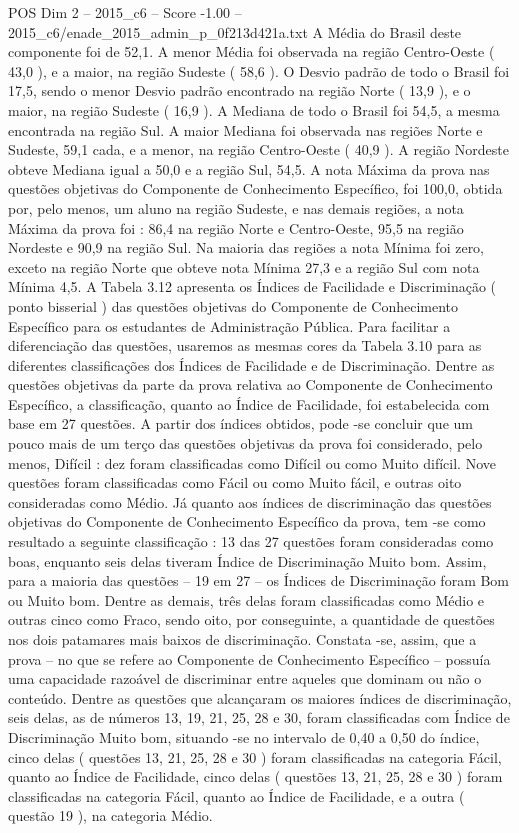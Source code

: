 \begin{textsample}{POS Dim 2 – 2015\_c6 – Score -1.00 – 2015\_c6/enade\_2015\_admin\_p\_0f213d421a.txt}
A Média do Brasil deste componente foi de 52,1.
A menor Média foi observada na região Centro-Oeste ( 43,0 ), e a maior, na região Sudeste ( 58,6 ).
O Desvio padrão de todo o Brasil foi 17,5, sendo o menor Desvio padrão encontrado na região Norte ( 13,9 ), e o maior, na região Sudeste ( 16,9 ).
A Mediana de todo o Brasil foi 54,5, a mesma encontrada na região Sul.
A maior Mediana foi observada nas regiões Norte e Sudeste, 59,1 cada, e a menor, na região Centro-Oeste ( 40,9 ).
A região Nordeste obteve Mediana igual a 50,0 e a região Sul, 54,5.
A nota Máxima da prova nas questões objetivas do Componente de Conhecimento Específico, foi 100,0, obtida por, pelo menos, um aluno na região Sudeste, e nas demais regiões, a nota Máxima da prova foi : 86,4 na região Norte e Centro-Oeste, 95,5 na região Nordeste e 90,9 na região Sul.
Na maioria das regiões a nota Mínima foi zero, exceto na região Norte que obteve nota Mínima 27,3 e a região Sul com nota Mínima 4,5.
A Tabela 3.12 apresenta os Índices de Facilidade e Discriminação ( ponto bisserial ) das questões objetivas do Componente de Conhecimento Específico para os estudantes de Administração Pública.
Para facilitar a diferenciação das questões, usaremos as mesmas cores da Tabela 3.10 para as diferentes classificações dos Índices de Facilidade e de Discriminação.
Dentre as questões objetivas da parte da prova relativa ao Componente de Conhecimento Específico, a classificação, quanto ao Índice de Facilidade, foi estabelecida com base em 27 questões.
A partir dos índices obtidos, pode -se concluir que um pouco mais de um terço das questões objetivas da prova foi considerado, pelo menos, Difícil : dez foram classificadas como Difícil ou como Muito difícil.
Nove questões foram classificadas como Fácil ou como Muito fácil, e outras oito consideradas como Médio.
Já quanto aos índices de discriminação das questões objetivas do Componente de Conhecimento Específico da prova, tem -se como resultado a seguinte classificação : 13 das 27 questões foram consideradas como boas, enquanto seis delas tiveram Índice de Discriminação Muito bom.
Assim, para a maioria das questões – 19 em 27 – os Índices de Discriminação foram Bom ou Muito bom.
Dentre as demais, três delas foram classificadas como Médio e outras cinco como Fraco, sendo oito, por conseguinte, a quantidade de questões nos dois patamares mais baixos de discriminação.
Constata -se, assim, que a prova – no que se refere ao Componente de Conhecimento Específico – possuía uma capacidade razoável de discriminar entre aqueles que dominam ou não o conteúdo.
Dentre as questões que alcançaram os maiores índices de discriminação, seis delas, as de números 13, 19, 21, 25, 28 e 30, foram classificadas com Índice de Discriminação Muito bom, situando -se no intervalo de 0,40 a 0,50 do índice, cinco delas ( questões 13, 21, 25, 28 e 30 ) foram classificadas na categoria Fácil, quanto ao Índice de Facilidade, cinco delas ( questões 13, 21, 25, 28 e 30 ) foram classificadas na categoria Fácil, quanto ao Índice de Facilidade, e a outra ( questão 19 ), na categoria Médio.

\end{textsample}
